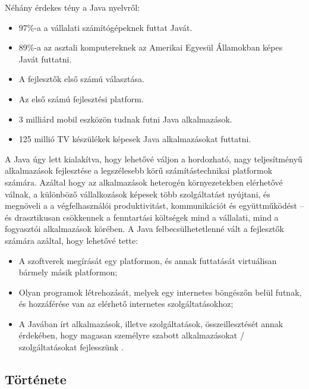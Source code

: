 \documentclass[a4paper,12pt]{report}
\begin{document}
\vspace{2mm}
Néhány érdekes tény a Java nyelvről:

\begin{itemize}
\item 97\%-a a vállalati számítógépeknek futtat Javát.
\item 89\%-a az asztali komputereknek az Amerikai Egyesül Államokban képes Javát futtatni.
\item A fejlesztők első számú választása.
\item Az első számú fejlesztési platform.
\item 3 milliárd mobil eszközön tudnak futni Java alkalmazások.
\item 125 millió TV készülékek képesek Java alkalmazásokat futtatni.
\end{itemize}

\vspace{2mm}
A Java úgy lett kialakítva, hogy lehetővé váljon a hordozható, nagy teljesítményű alkalmazások fejlesztése a legszélesebb körű számítástechnikai platformok számára. Azáltal hogy az alkalmazások heterogén környezetekben elérhetővé válnak, a különböző vállalkozások képesek több szolgáltatást nyújtani, és megnöveli a a végfelhasználói produktivitást, kommunikációt és együttműködést -- és drasztikusan csökkennek a fenntartási költségek mind a vállalati, mind a fogyasztói alkalmazások körében. A Java felbecsülhetetlenné vált a fejlesztők számára azáltal, hogy lehetővé tette:

\begin{itemize}
\item A szoftverek megírását egy platformon, és annak futtatását virtuálisan bármely másik platformon;
\item Olyan programok létrehozását, melyek egy internetes böngészőn belül futnak, és hozzáférése van az elérhető internetes szolgáltatásokhoz;
\item A Javában írt alkalmazások, illetve szolgáltatások, összeillesztését annak érdekében, hogy magasan személyre szabott alkalmazásokat / szolgáltatásokat fejlesszünk \cite{aboutjava}.
\end{itemize}




\subsection{Története}
\label{javahistory}
\end{document}
